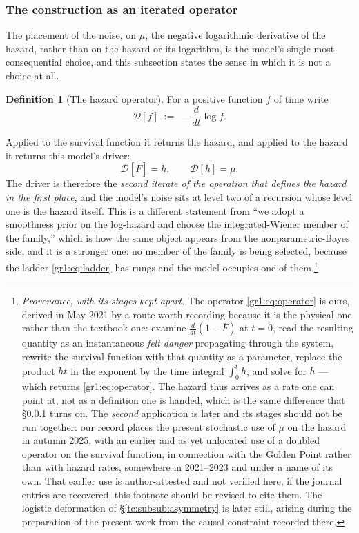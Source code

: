 \documentclass[11pt]{article}
\numberwithin{equation}{section}
\theoremstyle{plain}
\theoremstyle{definition}
\newtheorem{definition}[theorem]{Definition}
\theoremstyle{remark}
\begin{document}
\subsubsection{The construction as an iterated operator}
\label{gr1:subsub:operator}

The placement of the noise, on $\mu$, the negative logarithmic
derivative of the hazard, rather than on the hazard or its logarithm, is the model's single most consequential choice, and this subsection
states the sense in which it is not a choice at all.

\begin{definition}[The hazard operator]\label{gr1:def:operator}
For a positive function $f$ of time write
\begin{equation}\label{gr1:eq:operator}
\mathcal D[f]\;:=\;-\frac{d}{dt}\log f .
\end{equation}
\end{definition}

\noindent Applied to the survival function it returns the hazard, and
applied to the hazard it returns this model's driver:
\begin{equation}\label{gr1:eq:ladder}
\mathcal D[\bar F]=h,\qquad \mathcal D[h]=\mu .
\end{equation}
The driver is therefore the \emph{second iterate of the operation that
defines the hazard in the first place}, and the model's noise sits at
level two of a recursion whose level one is the hazard itself. This is a
different statement from ``we adopt a smoothness prior on the log-hazard
and choose the integrated-Wiener member of the family,'' which is how
the same object appears from the nonparametric-Bayes side, and it is a
stronger one: no member of the family is being selected, because the
ladder \eqref{gr1:eq:ladder} has rungs and the model occupies one of
them.\footnote{%
\emph{Provenance, with its stages kept apart.} The operator
\eqref{gr1:eq:operator} is ours, derived in May 2021 by a route
worth recording because it is the physical one rather than the textbook
one: examine $\frac{d}{dt}(1-\bar F)$ at $t=0$, read the resulting
quantity as an instantaneous \emph{felt danger} propagating through the
system, rewrite the survival function with that quantity as a parameter,
replace the product $ht$ in the exponent by the time integral
$\int_0^t h$, and solve for $h$ --- which returns
\eqref{gr1:eq:operator}. The hazard thus arrives as a rate one can point
at, not as a definition one is handed, which is the same difference that
\S\ref{gr1:subsub:operator} turns on. The \emph{second} application is
later and its stages should not be run together: our record
places the present stochastic use of $\mu$ on the hazard in autumn 2025,
with an earlier and as yet unlocated use of a doubled operator on the
survival function, in connection with the Golden Point rather than with
hazard rates, somewhere in 2021--2023 and under a name of its own. That
earlier use is author-attested and not verified here; if the journal
entries are recovered, this footnote should be revised to cite them.
The logistic deformation of \S\ref{tc:subsub:asymmetry} is later still,
arising during the preparation of the present work from the causal
constraint recorded there.}
\end{document}
